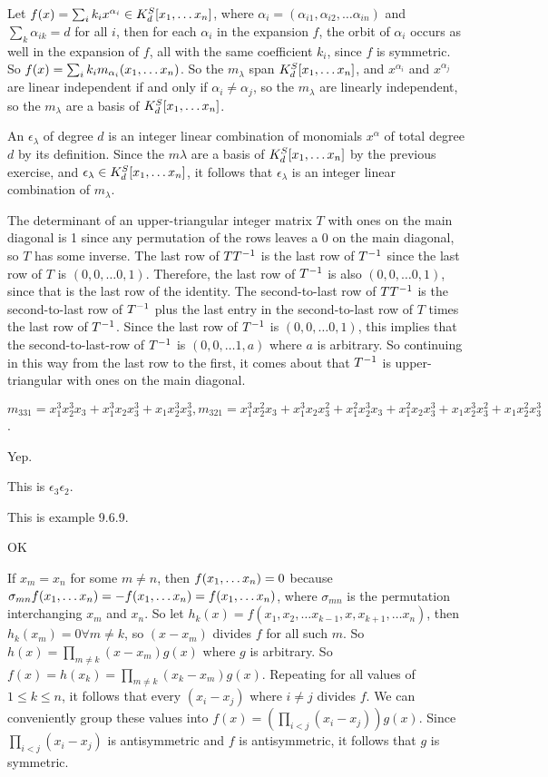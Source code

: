\documentclass[11pt, oneside]{article}   	%
\begin{document}
\item Let $f(x) = \sum_ik_ix^{\alpha_i} \in K_d^S[x_1, \ldots x_n]$, where $\alpha_i = (\alpha_{i1}, \alpha_{i2}, \ldots \alpha_{in})$ and $\sum_k\alpha_{ik} = d$ for all $i$, then for each $\alpha_i$ in the expansion $f$, the orbit of $\alpha_i$ occurs as well in the expansion of $f$, all with the same coefficient $k_i$, since $f$ is symmetric. So $f(x) = \sum_ik_im_{\alpha_i}(x_1, \ldots x_n)$. So the $m_\lambda$ span $K_d^S[x_1, \ldots x_n]$, and $x^{\alpha_i}$ and $x^{\alpha_j}$ are linear independent if and only if $\alpha_i \not = \alpha_j$, so the $m_\lambda$ are linearly independent, so the $m_\lambda$ are a basis of $K_d^S[x_1, \ldots x_n]$.
\item An $\epsilon_\lambda$ of degree $d$ is an integer linear combination of monomials $x^\alpha$ of total degree $d$ by its definition. Since the $m\lambda$ are a basis of $K_d^S[x_1, \ldots x_n]$ by the previous exercise, and $\epsilon_\lambda \in K_d^S[x_1, \ldots x_n]$, it follows that $\epsilon_\lambda$ is an integer linear combination of $m_\lambda$.
\item The determinant of an upper-triangular integer matrix $T$ with ones on the main diagonal is 1 since any permutation of the rows leaves a 0 on the main diagonal, so $T$ has some inverse. The last row of $TT^{-1}$ is the last row of $T^{-1}$ since the last row of $T$ is $(0, 0, \ldots 0, 1)$. Therefore, the last row of $T^{-1}$ is also $(0, 0, \ldots 0, 1)$, since that is the last row of the identity. The second-to-last row of $TT^{-1}$ is the second-to-last row of $T^{-1}$ plus the last entry in the second-to-last row of $T$ times the last row of $T^{-1}$. Since the last row of $T^{-1}$ is $(0, 0, \ldots 0, 1)$, this implies that the second-to-last-row of $T^{-1}$ is $(0, 0, \ldots 1, a)$ where $a$ is arbitrary. So continuing in this way from the last row to the first, it comes about that $T^{-1}$ is upper-triangular with ones on the main diagonal.
\item $m_{331} = x_1^3x_2^3x_3 + x_1^3x_2x_3^3 + x_1x_2^3x_3^3, m_{321} = x_1^3x_2^2x_3 + x_1^3x_2x_3^2 + x_1^2x_2^3x_3 + x_1^2x_2x_3^3 + x_1x_2^3x_3^2 + x_1x_2^2x_3^3$. 
\item Yep.
\item \be
\item This is $\epsilon_3\epsilon_2$.
\item This is example 9.6.9.
\ee
\item OK
\item If $x_m = x_n$ for some $m \not = n$, then $f(x_1, \ldots x_n) = 0$ because $\sigma_{mn}f(x_1, \ldots x_n) = -f(x_1, \ldots x_n) = f(x_1, \ldots x_n)$, where $\sigma_{mn}$ is the permutation interchanging $x_m$ and $x_n$. So let $h_k(x) = f(x_1, x_2, \ldots x_{k-1}, x, x_{k+1}, \ldots x_n)$, then $h_k(x_m) = 0 \forall m \not = k$, so $(x-x_m)$ divides $f$ for all such $m$. So $h(x) = \prod_{m \not = k}(x-x_m)g(x)$ where $g$ is arbitrary. So $f(x) = h(x_k) = \prod_{m \not = k} (x_k - x_m)g(x)$. Repeating for all values of $1 \le k \le n$, it follows that every $(x_i - x_j)$ where $i \not = j$ divides $f$. We can conveniently group these values into $f(x) = (\prod_{i < j}(x_i - x_j))g(x)$. Since $\prod_{i < j}(x_i - x_j)$ is antisymmetric and $f$ is antisymmetric, it follows that $g$ is symmetric.
\ee
\end{document}
